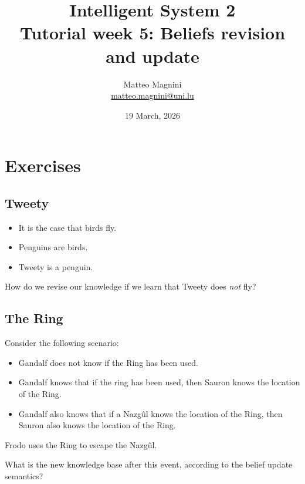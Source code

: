 \documentclass[11pt]{article}
\title{
    Intelligent System 2\\
    Tutorial week 5: Beliefs revision and update
}
\author{
    Matteo Magnini\\
    \href{mailto:matteo.magnini@uni.lu}{matteo.magnini@uni.lu}
}
\date{
    19 March, 2026
}
\begin{document}
    \maketitle

    \section{Exercises}\label{sec:exercises}

    \subsection{Tweety}

    \begin{itemize}
        \item It is the case that birds fly.
        \item Penguins are birds.
        \item Tweety is a penguin.
    \end{itemize}

    How do we revise our knowledge if we learn that Tweety does \emph{not} fly?

    \subsection{The Ring}

    Consider the following scenario:

    \begin{itemize}
        \item Gandalf does not know if the Ring has been used.
        \item Gandalf knows that if the ring has been used, then Sauron knows the location of the Ring.
        \item Gandalf also knows that if a Nazgûl knows the location of the Ring, then Sauron also knows the location of the Ring.
    \end{itemize}

    Frodo uses the Ring to escape the Nazgûl.

    What is the new knowledge base after this event, according to the belief update semantics?
\end{document}
